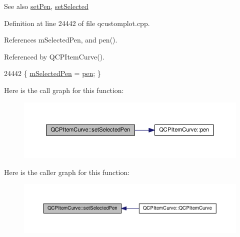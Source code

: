 \begin{DoxySeeAlso}{See also}
\hyperlink{class_q_c_p_item_curve_a034be908440aec785c34b92843461221}{set\+Pen}, \hyperlink{class_q_c_p_abstract_item_a203de94ad586cc44d16c9565f49d3378}{set\+Selected} 
\end{DoxySeeAlso}


Definition at line 24442 of file qcustomplot.\+cpp.



References m\+Selected\+Pen, and pen().



Referenced by Q\+C\+P\+Item\+Curve().


\begin{DoxyCode}
24442 \{ \hyperlink{class_q_c_p_item_curve_ab22cbab261b20be5aa8e4ca252149246}{mSelectedPen} = \hyperlink{class_q_c_p_item_curve_abc6321e55a9ba1a0c7df407843dfa252}{pen}; \}
\end{DoxyCode}


Here is the call graph for this function\+:\nopagebreak
\begin{figure}[H]
\begin{center}
\leavevmode
\includegraphics[width=350pt]{class_q_c_p_item_curve_a375b917669f868c5a106bf2f1ab7c26d_cgraph}
\end{center}
\end{figure}




Here is the caller graph for this function\+:\nopagebreak
\begin{figure}[H]
\begin{center}
\leavevmode
\includegraphics[width=350pt]{class_q_c_p_item_curve_a375b917669f868c5a106bf2f1ab7c26d_icgraph}
\end{center}
\end{figure}


\hypertarget{class_q_c_p_item_curve_ac3488d8b1a6489c845dc5bff3ef71124}{}
